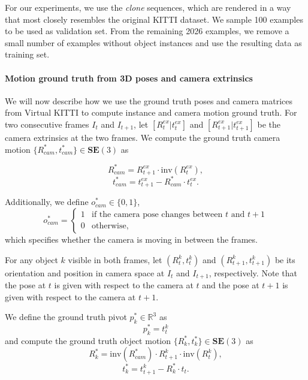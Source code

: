 For our experiments, we use the \emph{clone} sequences, which are rendered in a
way that most closely resembles the original KITTI dataset. We sample 100 examples
to be used as validation set. From the remaining 2026 examples,
we remove a small number of examples without object instances and use the resulting
data as training set.

\paragraph{Motion ground truth from 3D poses and camera extrinsics}
We will now describe how we use the ground truth poses and camera matrices from Virtual KITTI to
compute instance and camera motion ground truth.
For two consecutive frames $I_t$ and $I_{t+1}$,
let $[R_t^{ex}|t_t^{ex}]$
and $[R_{t+1}^{ex}|t_{t+1}^{ex}]$
be the camera extrinsics at the two frames.
We compute the ground truth camera motion
$\{R_{cam}^*, t_{cam}^*\} \in \mathbf{SE}(3)$ as

\begin{equation}
R_{cam}^* = R_{t+1}^{ex}  \cdot \mathrm{inv}(R_t^{ex}),
\end{equation}
\begin{equation}
t_{cam}^* = t_{t+1}^{ex}  - R_{cam}^* \cdot t_t^{ex}.
\end{equation}

Additionally, we define $o_{cam}^* \in \{ 0, 1 \}$,
\begin{equation}
o_{cam}^* =
\begin{cases}
1 &\text{if the camera pose changes between $t$ and $t+1$} \\
0 &\text{otherwise,}
\end{cases}
\end{equation}
which specifies whether the camera is moving in between the frames.

For any object $k$ visible in both frames, let
$(R_t^k, t_t^k)$ and $(R_{t+1}^k, t_{t+1}^k)$
be its orientation and position in camera space
at $I_t$ and $I_{t+1}$, respectively.
Note that the pose at $t$ is given with respect to the camera at $t$ and
the pose at $t+1$ is given with respect to the camera at $t+1$.

We define the ground truth pivot $p_k^* \in \mathbb{R}^3$ as
\begin{equation}
p_k^* = t_t^k
\end{equation}
and compute the ground truth object motion
$\{R_k^*, t_k^*\} \in \mathbf{SE}(3)$ as
\begin{equation}
R_k^* = \mathrm{inv}(R_{cam}^*) \cdot R_{t+1}^k \cdot \mathrm{inv}(R_t^k),
\end{equation}
\begin{equation}
t_k^* = t_{t+1}^{k}  - R_k^* \cdot t_t.
\end{equation}

